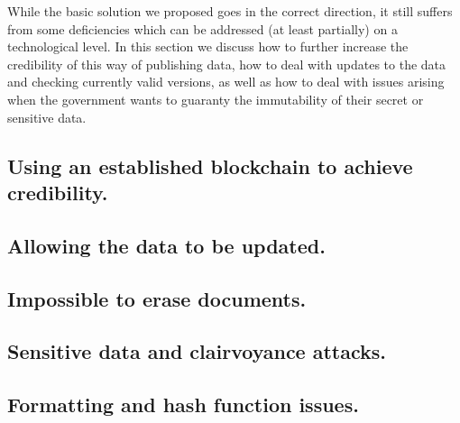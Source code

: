

While the basic solution we proposed goes in the correct direction, it still suffers from some deficiencies which can be addressed (at least partially) on a technological level. In this section we discuss how to further increase the credibility of this way of publishing data, how to deal with updates to the data and checking currently valid versions, as well as how to deal with issues arising when the government wants to guaranty the immutability of their secret or sensitive data. %

\subsection{Using an established blockchain to achieve credibility.}



\subsection{Allowing the data to be updated.}



\subsection{Impossible to erase documents.}



\subsection{Sensitive data and clairvoyance attacks.}



\subsection{Formatting and hash function issues.}



